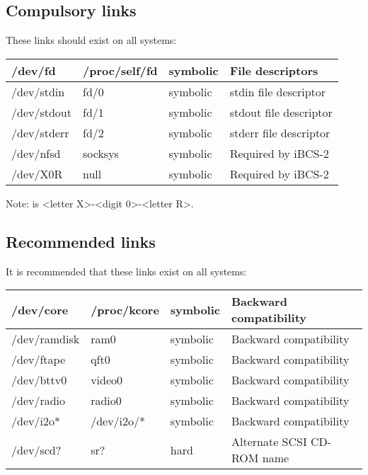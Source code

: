 \documentclass[a4paper,8pt,english]{sphinxmanual}
\begin{document}
\subsection{Compulsory links}
\label{admin-guide/devices:compulsory-links}
These links should exist on all systems:

\begin{tabulary}{\linewidth}{|L|L|L|L|}
\hline

/dev/fd
 & 
/proc/self/fd
 & 
symbolic
 & 
File descriptors
\\
\hline
/dev/stdin
 & 
fd/0
 & 
symbolic
 & 
stdin file descriptor
\\
\hline
/dev/stdout
 & 
fd/1
 & 
symbolic
 & 
stdout file descriptor
\\
\hline
/dev/stderr
 & 
fd/2
 & 
symbolic
 & 
stderr file descriptor
\\
\hline
/dev/nfsd
 & 
socksys
 & 
symbolic
 & 
Required by iBCS-2
\\
\hline
/dev/X0R
 & 
null
 & 
symbolic
 & 
Required by iBCS-2
\\
\hline\end{tabulary}


Note:  is \textless{}letter X\textgreater{}-\textless{}digit 0\textgreater{}-\textless{}letter R\textgreater{}.


\subsection{Recommended links}
\label{admin-guide/devices:recommended-links}
It is recommended that these links exist on all systems:

\begin{tabulary}{\linewidth}{|L|L|L|L|}
\hline

/dev/core
 & 
/proc/kcore
 & 
symbolic
 & 
Backward compatibility
\\
\hline
/dev/ramdisk
 & 
ram0
 & 
symbolic
 & 
Backward compatibility
\\
\hline
/dev/ftape
 & 
qft0
 & 
symbolic
 & 
Backward compatibility
\\
\hline
/dev/bttv0
 & 
video0
 & 
symbolic
 & 
Backward compatibility
\\
\hline
/dev/radio
 & 
radio0
 & 
symbolic
 & 
Backward compatibility
\\
\hline
/dev/i2o*
 & 
/dev/i2o/*
 & 
symbolic
 & 
Backward compatibility
\\
\hline
/dev/scd?
 & 
sr?
 & 
hard
 & 
Alternate SCSI CD-ROM name
\\
\hline\end{tabulary}
\end{document}
